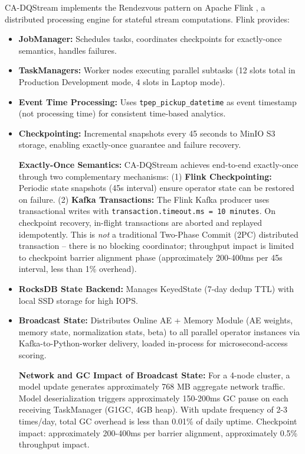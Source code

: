 CA-DQStream implements the Rendezvous pattern on Apache Flink \citep{flinkdocs2024}, a distributed processing engine for stateful stream computations. Flink provides:

\begin{itemize}
    \item \textbf{JobManager:} Schedules tasks, coordinates checkpoints for exactly-once semantics, handles failures.
    \item \textbf{TaskManagers:} Worker nodes executing parallel subtasks (12 slots total in Production Development mode, 4 slots in Laptop mode).
    \item \textbf{Event Time Processing:} Uses \texttt{tpep\_pickup\_datetime} as event timestamp (not processing time) for consistent time-based analytics.
    \item \textbf{Checkpointing:} Incremental snapshots every 45 seconds to MinIO S3 storage, enabling exactly-once guarantee and failure recovery.

\textbf{Exactly-Once Semantics:} CA-DQStream achieves end-to-end exactly-once through two complementary mechanisms: (1) \textbf{Flink Checkpointing:} Periodic state snapshots (45s interval) ensure operator state can be restored on failure. (2) \textbf{Kafka Transactions:} The Flink Kafka producer uses transactional writes with \texttt{transaction.timeout.ms = 10 minutes}. On checkpoint recovery, in-flight transactions are aborted and replayed idempotently. This is \emph{not} a traditional Two-Phase Commit (2PC) distributed transaction -- there is no blocking coordinator; throughput impact is limited to checkpoint barrier alignment phase (approximately 200-400ms per 45s interval, less than 1\% overhead).
    \item \textbf{RocksDB State Backend:} Manages KeyedState (7-day dedup TTL) with local SSD storage for high IOPS.
    \item \textbf{Broadcast State:} Distributes Online AE + Memory Module (AE weights, memory state, normalization stats, beta) to all parallel operator instances via Kafka-to-Python-worker delivery, loaded in-process for microsecond-access scoring.

\textbf{Network and GC Impact of Broadcast State:} For a 4-node cluster, a model update generates approximately 768 MB aggregate network traffic. Model deserialization triggers approximately 150-200ms GC pause on each receiving TaskManager (G1GC, 4GB heap). With update frequency of 2-3 times/day, total GC overhead is less than 0.01\% of daily uptime. Checkpoint impact: approximately 200-400ms per barrier alignment, approximately 0.5\% throughput impact.


\end{itemize}
